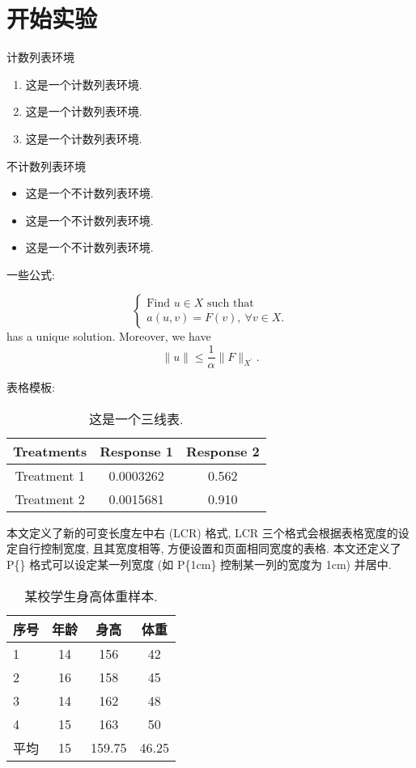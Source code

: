 \section{开始实验}
\zhlipsum[2]\cite{HPC}

计数列表环境
\begin{enumerate}
	\item 这是一个计数列表环境.
	\item 这是一个计数列表环境.
	\item 这是一个计数列表环境.
\end{enumerate}

\vspace{2ex}
不计数列表环境
\begin{itemize}
	\item 这是一个不计数列表环境.
	\item 这是一个不计数列表环境.
	\item 这是一个不计数列表环境.
\end{itemize}



一些公式:

$$
		\left\{\begin{array}{l}
			\mbox{Find } u \in X \mbox{ such that } \\
			a(u, v)=F(v),~\forall v \in X.
		\end{array} \right. 
$$
has a unique solution. Moreover, we have
\begin{equation}
	 \|u\| \leq \frac{1}{\alpha}\|F\|_{X^{\prime}}. 
\end{equation}


表格模板:

\begin{table}
	\caption{这是一个三线表.}	
	\centering
	\begin{tabular}{ccc}
		\toprule
		\textbf{Treatments} & \textbf{Response 1} & \textbf{Response 2}\\
		\midrule
		Treatment 1 & 0.0003262 & 0.562 \\
		Treatment 2 & 0.0015681 & 0.910 \\
		\bottomrule
	\end{tabular}
\end{table}


本文定义了新的可变长度左中右 (LCR) 格式, LCR 三个格式会根据表格宽度的设定自行控制宽度, 且其宽度相等, 方便设置和页面相同宽度的表格. 本文还定义了 P\{\} 格式可以设定某一列宽度 (如 P\{1cm\} 控制某一列的宽度为 1cm) 并居中.%
\begin{table}[!htp]
	\centering
	\caption{某校学生身高体重样本.}
	\label{tab2:heightweight}	
	\begin{tabular}{lccc}
		\toprule
		序号&年龄&身高&体重\\
		\midrule
		1&14&156&42\\
		2&16&158&45\\
		3&14&162&48\\
		4&15&163&50\\
		\cmidrule{2-4}
		平均&15&159.75&46.25\\
		\bottomrule
	\end{tabular}
\end{table}

